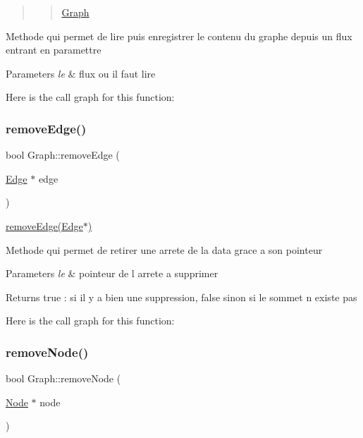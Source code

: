 \begin{quote}
\begin{quote}
\mbox{\hyperlink{class_graph}{Graph}}\end{quote}
\end{quote}


Methode qui permet de lire puis enregistrer le contenu du graphe depuis un flux entrant en paramettre


\begin{DoxyParams}{Parameters}
{\em le} & flux ou il faut lire \\
\hline
\end{DoxyParams}
Here is the call graph for this function\+:
\mbox{\label{class_graph_a97b5c94aeef2c0bea6a3f424b0fc01b8}} 
\subsubsection{\texorpdfstring{remove\+Edge()}{removeEdge()}}
{\footnotesize\ttfamily bool Graph\+::remove\+Edge (\begin{DoxyParamCaption}\item[{\mbox{\hyperlink{class_edge}{Edge}} $\ast$}]{edge }\end{DoxyParamCaption})}



\mbox{\hyperlink{class_graph_a97b5c94aeef2c0bea6a3f424b0fc01b8}{remove\+Edge(\+Edge$\ast$)}} 

Methode qui permet de retirer une arrete de la data grace a son pointeur


\begin{DoxyParams}{Parameters}
{\em le} & pointeur de l arrete a supprimer\\
\hline
\end{DoxyParams}
\begin{DoxyReturn}{Returns}
true \+: si il y a bien une suppression, false sinon si le sommet n existe pas 
\end{DoxyReturn}
Here is the call graph for this function\+:
\mbox{\label{class_graph_a32b254ea9535f8f4ad831d129db525e8}} 
\subsubsection{\texorpdfstring{remove\+Node()}{removeNode()}\hspace{0.1cm}{\footnotesize\ttfamily [1/2]}}
{\footnotesize\ttfamily bool Graph\+::remove\+Node (\begin{DoxyParamCaption}\item[{\mbox{\hyperlink{class_node}{Node}} $\ast$}]{node }\end{DoxyParamCaption})}



